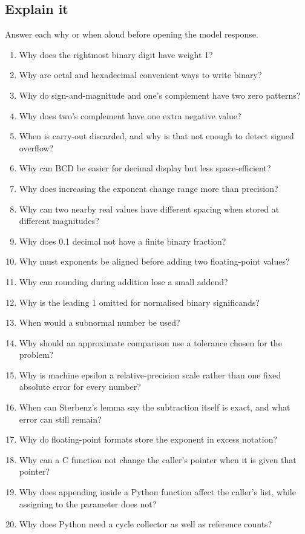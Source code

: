 \documentclass[11pt]{article}
\begin{document}
\begin{keepsection}
\section{Explain it}

Answer each why or when aloud before opening the model response.

\begin{enumerate}
\item Why does the rightmost binary digit have weight 1?
\item Why are octal and hexadecimal convenient ways to write binary?
\item Why do sign-and-magnitude and one’s complement have two zero patterns?
\item Why does two’s complement have one extra negative value?
\item When is carry-out discarded, and why is that not enough to detect signed overflow?
\item Why can BCD be easier for decimal display but less space-efficient?
\item Why does increasing the exponent change range more than precision?
\item Why can two nearby real values have different spacing when stored at different magnitudes?
\item Why does 0.1 decimal not have a finite binary fraction?
\item Why must exponents be aligned before adding two floating-point values?
\item Why can rounding during addition lose a small addend?
\item Why is the leading 1 omitted for normalised binary significands?
\item When would a subnormal number be used?
\item Why should an approximate comparison use a tolerance chosen for the problem?
\item Why is machine epsilon a relative-precision scale rather than one fixed absolute error for every number?
\item When can Sterbenz’s lemma say the subtraction itself is exact, and what error can still remain?
\item Why do floating-point formats store the exponent in excess notation?
\item Why can a C function not change the caller’s pointer when it is given that pointer?
\item Why does appending inside a Python function affect the caller’s list, while assigning to the parameter does not?
\item Why does Python need a cycle collector as well as reference counts?
\end{enumerate}

\end{keepsection}
\end{document}
